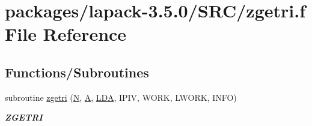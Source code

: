 \hypertarget{zgetri_8f}{}\section{packages/lapack-\/3.5.0/\+S\+R\+C/zgetri.f File Reference}
\label{zgetri_8f}
\subsection*{Functions/\+Subroutines}
\begin{DoxyCompactItemize}
\item 
subroutine \hyperlink{group__complex16GEcomputational_gab490cfc4b92edec5345479f19a9a72ca}{zgetri} (\hyperlink{polmisc_8c_a0240ac851181b84ac374872dc5434ee4}{N}, \hyperlink{classA}{A}, \hyperlink{example__user_8c_ae946da542ce0db94dced19b2ecefd1aa}{L\+D\+A}, I\+P\+I\+V, W\+O\+R\+K, L\+W\+O\+R\+K, I\+N\+F\+O)
\begin{DoxyCompactList}\small\item\em {\bfseries Z\+G\+E\+T\+R\+I} \end{DoxyCompactList}\end{DoxyCompactItemize}
